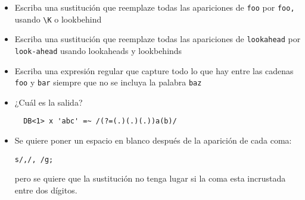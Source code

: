 \begin{exercise}
\begin{itemize}
\item Escriba una sustitución que reemplaze todas las apariciones
de \verb|foo| por \verb|foo,| usando \verb|\K| o lookbehind
\item Escriba una sustitución que reemplaze todas las apariciones
de \verb|lookahead| por \verb|look-ahead| usando lookaheads y lookbehinds
\item
Escriba una expresión regular que capture todo lo que hay 
entre las cadenas \verb|foo| y \verb|bar| siempre que no se incluya la
palabra \verb|baz|
\item
¿Cuál es la salida?
\begin{verbatim}
  DB<1> x 'abc' =~ /(?=(.)(.)(.))a(b)/
\end{verbatim}
\item
Se quiere poner un espacio en blanco después de la aparición de cada coma:
\begin{verbatim}
s/,/, /g;
\end{verbatim}
pero se quiere que la sustitución no tenga lugar si la coma esta incrustada entre
dos dígitos.

\end{itemize}
\end{exercise}
